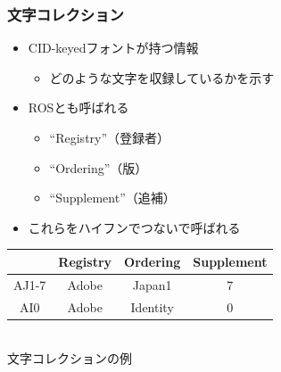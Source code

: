 \begin{frame}\frametitle{文字コレクション}
  \begin{itemize}
  \item CID-keyedフォントが持つ情報
    \begin{itemize}
    \item どのような文字を収録しているかを示す
    \end{itemize}
  \item ROSとも呼ばれる
    \begin{itemize}
    \item ``Registry''（登録者）
    \item ``Ordering''（版）
    \item ``Supplement''（追補）
    \end{itemize}
    \item これらをハイフンでつないで呼ばれる
  \end{itemize}

  \begin{center}
    \footnotesize
    \begin{tabular}{c|c@{-}c@{-}c}
      & Registry & Ordering & Supplement \\
      \hline
      AJ1-7 & Adobe & Japan1 & 7 \\
      AI0   & Adobe & Identity & 0
    \end{tabular} \\
    文字コレクションの例
  \end{center}
\end{frame}

